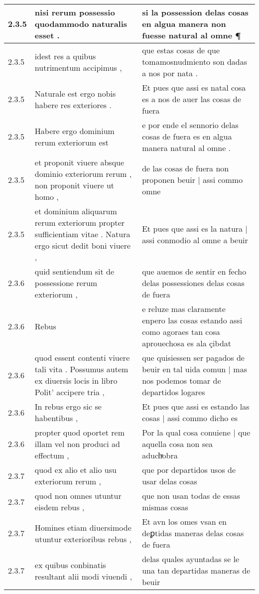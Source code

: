 \begin{tabular}{|p{1cm}|p{6.5cm}|p{6.5cm}|}
2.3.5 & nisi rerum possessio quodammodo naturalis esset . & si la possession delas cosas en algua manera non fuesse natural al omne ¶ \\\hline
2.3.5 & idest res a quibus nutrimentum accipimus , & que estas cosas de que tomamosnudmiento son dadas a nos por nata . \\\hline
2.3.5 & Naturale est ergo nobis habere res exteriores . & Et pues que assi es natal cosa es a nos de auer las cosas de fuera \\\hline
2.3.5 & Habere ergo dominium rerum exteriorum est & e por ende el sennorio delas cosas de fuera es en algua manera natural al omne . \\\hline
2.3.5 & et proponit viuere absque dominio exteriorum rerum , non proponit viuere ut homo , & de las cosas de fuera non proponen beuir | assi commo omne \\\hline
2.3.5 & et dominium aliquarum rerum exteriorum propter sufficientiam vitae . Natura ergo sicut dedit boni viuere , & Et pues que assi es la natura | assi conmodio al omne a beuir \\\hline
2.3.6 & quid sentiendum sit de possessione rerum exteriorum , & que auemos de sentir en fecho delas possessiones delas cosas de fuera \\\hline
2.3.6 & Rebus & e reluze mas claramente enpero las cosas estando assi como agoraes tan cosa aprouechosa es ala çibdat \\\hline
2.3.6 & quod essent contenti viuere tali vita . Possumus autem ex diuersis locis in libro Polit’ accipere tria , & que quisiessen ser pagados de beuir en tal uida comun | mas nos podemos tomar de departidos logares \\\hline
2.3.6 & In rebus ergo sic se habentibus , & Et pues que assi es estando las cosas | assi commo dicho es \\\hline
2.3.6 & propter quod oportet rem illam vel non produci ad effectum , & Por la qual cosa conuiene | que aquella cosa non sea aduchͣobra \\\hline
2.3.7 & quod ex alio et alio usu exteriorum rerum , & que por departidos usos de usar delas cosas \\\hline
2.3.7 & quod non omnes utuntur eisdem rebus , & que non usan todas de essas mismas cosas \\\hline
2.3.7 & Homines etiam diuersimode utuntur exterioribus rebus , & Et avn los omes vsan en deꝑtidas maneras delas cosas de fuera \\\hline
2.3.7 & ex quibus conbinatis resultant alii modi viuendi , & delas quales ayuntadas se le una tan departidas maneras de beuir \\\hline

\end{tabular}
